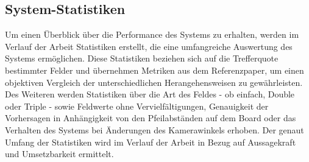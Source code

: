 \subsection{System-Statistiken}
\label{sec:methodik:statistiken}

Um einen Überblick über die Performance des Systems zu erhalten, werden im Verlauf der Arbeit Statistiken erstellt, die eine umfangreiche Auswertung des Systems ermöglichen. Diese Statistiken beziehen sich auf die Trefferquote bestimmter Felder und übernehmen Metriken aus dem Referenzpaper, um einen objektiven Vergleich der unterschiedlichen Herangehensweisen zu gewährleisten. Des Weiteren werden Statistiken über die Art des Feldes - ob einfach, Double oder Triple - sowie Feldwerte ohne Vervielfältigungen, Genauigkeit der Vorhersagen in Anhängigkeit von den Pfeilabständen auf dem Board oder das Verhalten des Systems bei Änderungen des Kamerawinkels erhoben. Der genaut Umfang der Statistiken wird im Verlauf der Arbeit in Bezug auf Aussagekraft und Umsetzbarkeit ermittelt.

